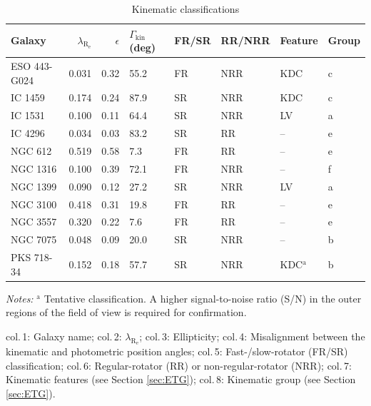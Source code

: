 		\begin{table}
			\centering
		\begin{threeparttable}
			\caption{Kinematic classifications}
			\label{tab:classify}
			\begin{tabular}{l r r p{0.7cm} l l l l}
				\hline
				\hline
				Galaxy		& $\lambda_\mathrm{R_e}$ & $\epsilon$  & $\Gamma_\text{kin}$ (deg) & FR/SR 	& RR/NRR 	& Feature & Group 	\\
				\hline 
				ESO 443-G024 & 0.031 & 0.32 & 55.2 	& FR & NRR & KDC & c \\
				IC 1459 	& 0.174 & 0.24 & 87.9	& SR & NRR & KDC & c \\
				IC 1531 	& 0.100 & 0.11 & 64.4 	& SR & NRR & LV & a \\
				IC 4296		& 0.034 & 0.03 & 83.2 	& SR & RR & -- & e \\
				NGC 612 	& 0.519 & 0.58 & \leavevmode\phantom{0}7.3 	& FR & RR & -- & e \\
				NGC 1316 	& 0.100 & 0.39 & 72.1 	& FR & NRR & -- & f \\
				NGC 1399 	& 0.090 & 0.12 & 27.2 	& SR & NRR & LV & a \\
				NGC 3100 	& 0.418 & 0.31 & 19.8 	& FR & RR & -- & e \\
				NGC 3557 	& 0.320 & 0.22 & \leavevmode\phantom{0}7.6 	& FR & RR & -- & e\\
				NGC 7075 	& 0.048 & 0.09 & 20.0 	& SR & NRR & -- & b \\
				PKS 718-34  & 0.152 & 0.18 & 57.7 	& SR & NRR & KDC$^\text{a}$ & b\\
				\hline
				\hline
			\end{tabular}
			\begin{tablenotes}
			\small
			\item \textit{Notes:} $^\text{a}$ Tentative classification. A higher signal-to-noise ratio (S/N) in the outer regions of the field of view is required for confirmation.
			\item col.\,1: Galaxy name; col.\,2: $\lambda_\mathrm{R_e}$; col.\,3: Ellipticity; col.\,4: Misalignment between the kinematic and photometric position angles; col.\,5: Fast-/slow-rotator (FR/SR) classification; col.\,6: Regular-rotator (RR) or non-regular-rotator (NRR); col.\,7: Kinematic features (see Section \ref{sec:ETG}); col.\,8: Kinematic group (see Section \ref{sec:ETG}).
			\end{tablenotes}
		\end{threeparttable}
		\end{table}




